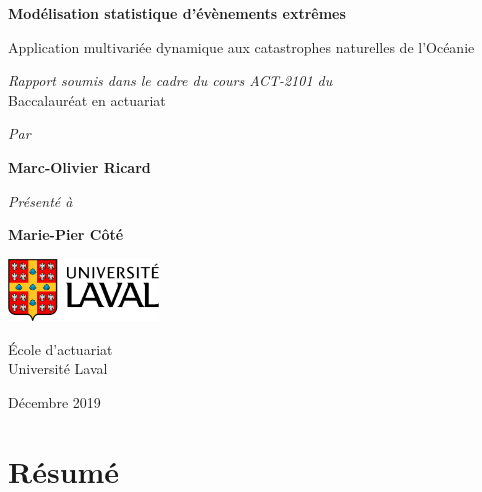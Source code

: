 \documentclass[11pt]{report}
\numberwithin{equation}{section}
\begin{document}



\begin{titlepage}
    \begin{center}
        \vspace*{1cm}
        
        \Large
        \textbf{Modélisation statistique d'évènements extrêmes}
        
        \large
        \vspace{0.4cm}
        
        Application multivariée dynamique aux catastrophes naturelles de l'Océanie
 
        \vspace{3cm}
 
        \textit{Rapport soumis dans le cadre du cours ACT-2101 du} \\
        Baccalauréat en actuariat
 
        \vspace{1cm}
        
        \textit{Par}
 
        \textbf{Marc-Olivier Ricard}
        
        \vspace{1cm}
        
        \textit{Présenté à}
 
        \textbf{Marie-Pier Côté}
 
        \vfill
 
        \includegraphics[width=0.3\textwidth]{Laval.PNG}
        
        \vspace{1.5cm}
 
        École d'actuariat\\
        Université Laval\\
        
        \vspace{0.5cm}
        
        Décembre 2019
 
    \end{center}
\end{titlepage}


\tableofcontents
\cleardoublepage


\chapter*{Résumé}
\label{chap:résumé} 
\end{document}
